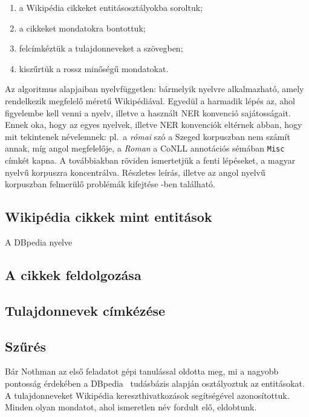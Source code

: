 \documentclass{llncs}
\begin{document}
\begin{enumerate}
\item a Wikipédia cikkeket entitásosztályokba soroltuk;
\item a cikkeket mondatokra bontottuk;
\item felcímkéztük a tulajdonneveket a szövegben;
\item kiszűrtük a rossz minőségű mondatokat.
\end{enumerate}

Az algoritmus alapjaiban nyelvfüggetlen: bármelyik nyelvre alkalmazható, amely
rendelkezik megfelelő méretű Wikipédiával. Egyedül a harmadik lépés az, ahol
figyelembe kell venni a nyelv, illetve a használt NER konvenció sajátosságait.
Ennek oka, hogy az egyes nyelvek, illetve NER konvenciók eltérnek abban, hogy
mit tekintenek névelemnek: pl.~a \textit{római} szó a Szeged korpuszban nem
számít annak, míg angol megfelelője, a \textit{Roman} a CoNLL annotációs sémában
\texttt{Misc} címkét kapna. A továbbiakban röviden ismertetjük a fenti lépéseket,
a magyar nyelvű korpuszra koncentrálva. Részletes leírás, illetve az angol nyelvű
korpuszban felmerülő problémák kifejtése \cite{simon-nemeskey:2012:NEWS2012}-ben
található.


\subsection{Wikipédia cikkek mint entitások}

A DBpedia nyelve 

\subsection{A cikkek feldolgozása}
\subsection{Tulajdonnevek címkézése}

\subsection{Szűrés}

Bár Nothman az első feladatot gépi tanulással oldotta meg, mi a nagyobb
pontosság érdekében a DBpedia~\cite{Bizer:09} tudásbázis alapján osztályoztuk az
entitásokat. A tulajdonneveket Wikipédia kereszthivatkozások segítségével azonosítottuk.
Minden olyan mondatot, ahol ismeretlen név fordult elő, eldobtunk.
\end{document}
